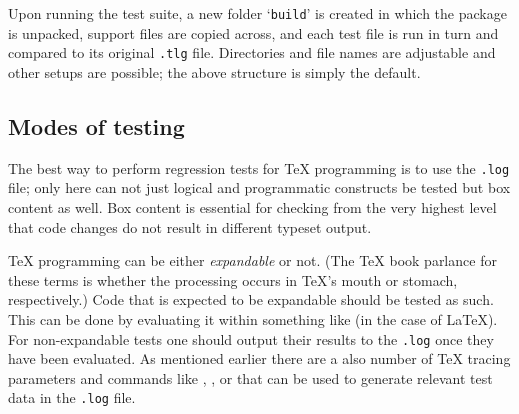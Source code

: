 \documentclass[a4paper]{ltugboat}
\begin{document}
Upon
running the test suite, a new folder `\texttt{build}' is created in
which the package is unpacked, support files are copied across, and
each test file is run in turn and compared to its original
\texttt{.tlg} file. Directories and file names are adjustable and
other setups are possible; the above structure is simply the default.


\subsection{Modes of testing}

The best way to perform regression tests for \TeX{} programming is to
use the \texttt{.log} file; only here can not just logical and
programmatic constructs be tested but box content as well.  Box
content is essential for checking from the very highest level that
code changes do not result in different typeset output.

\TeX{} programming can be either \emph{expandable} or not.  (The \TeX
book parlance for these terms is whether the processing occurs in
\TeX's mouth or stomach, respectively.)  Code that is expected to be
expandable should be tested as such.  This can be done by evaluating it within something like  (in the case of \LaTeX). For non-expandable tests one should output
their results to the \texttt{.log} once they have been evaluated.
%
As mentioned earlier there are a also number of \TeX{} tracing parameters
and commands like , , or  that
can be used to generate relevant test data in the \texttt{.log} file.
\end{document}
